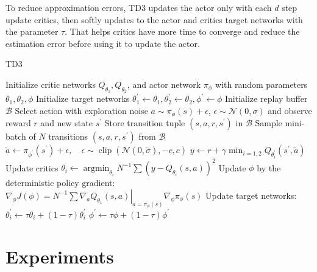 To reduce approximation errors, TD3 updates the actor only with each $d$ step update critics, then softly updates to the actor and critics target networks with the parameter $\tau$. That helps critics have more time to converge and reduce the estimation error before using it to update the actor.
\begin{algorithm} [H]
\caption{TD3}\label{alg:cap}
    \STATE Initialize critic networks $Q_{\theta_{1}}, Q_{\theta_{2}}$, and actor network $\pi_{\phi}$ with random parameters $\theta_{1}, \theta_{2}, \phi$
    \STATE Initialize target networks $\theta_{1}^{\prime} \leftarrow \theta_{1}, \theta_{2}^{\prime} \leftarrow \theta_{2}, \phi^{\prime} \leftarrow \phi$
    \STATE Initialize replay buffer $\mathcal{B}$
        \STATE Select action with exploration noise $a \sim \pi_{\phi}(s)+\epsilon$,
        \STATE ${\epsilon \sim \mathcal{N}(0, \sigma)}$ and observe reward $r$ and new state $s^{\prime}$
        \STATE Store transition tuple $\left(s, a, r, s^{\prime}\right)$ in $\mathcal{B}$
        \STATE
        \STATE Sample mini-batch of $N$ transitions $\left(s, a, r, s^{\prime}\right)$ from $\mathcal{B}$
        \STATE $\tilde{a} \leftarrow \pi_{\phi^{\prime}}\left(s^{\prime}\right)+\epsilon, \quad \epsilon \sim \operatorname{clip}(\mathcal{N}(0, \tilde{\sigma}),-c, c)$
        \STATE $y \leftarrow r+\gamma \min _{i=1,2} Q_{\theta_{i}^{\prime}}\left(s^{\prime}, \tilde{a}\right)$
        \STATE Update critics $\theta_{i} \leftarrow \operatorname{argmin}_{\theta_{i}} N^{-1} \sum\left(y-Q_{\theta_{i}}(s, a)\right)^{2}$
            \STATE Update $\phi$ by the deterministic policy gradient:
            \STATE ${\nabla_{\phi} J(\phi)=\left.N^{-1} \sum \nabla_{a} Q_{\theta_{1}}(s, a)\right|_{a=\pi_{\phi}(s)} \nabla_{\phi} \pi_{\phi}(s)}$
            \STATE Update target networks:
            \STATE ${\theta_{i}^{\prime} \leftarrow \tau \theta_{i}+(1-\tau) \theta_{i}^{\prime}}$
            \STATE ${\phi^{\prime} \leftarrow \tau \phi+(1-\tau) \phi^{\prime}}$
        \ENDIF
    \ENDFOR
\end{algorithm}    

\section{Experiments}

